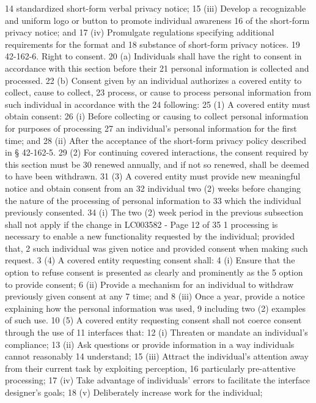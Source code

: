 14 standardized short-form verbal privacy notice;
15 (iii) Develop a recognizable and uniform logo or button to promote individual awareness
16 of the short-form privacy notice; and
17 (iv) Promulgate regulations specifying additional requirements for the format and
18 substance of short-form privacy notices.
19 42-162-6. Right to consent.
20 (a) Individuals shall have the right to consent in accordance with this section before their
21 personal information is collected and processed.
22 (b) Consent given by an individual authorizes a covered entity to collect, cause to collect,
23 process, or cause to process personal information from such individual in accordance with the
24 following:
25 (1) A covered entity must obtain consent:
26 (i) Before collecting or causing to collect personal information for purposes of processing
27 an individual's personal information for the first time; and
28 (ii) After the acceptance of the short-form privacy policy described in § 42-162-5.
29 (2) For continuing covered interactions, the consent required by this section must be
30 renewed annually, and if not so renewed, shall be deemed to have been withdrawn.
31 (3) A covered entity must provide new meaningful notice and obtain consent from an
32 individual two (2) weeks before changing the nature of the processing of personal information to
33 which the individual previously consented.
34 (i) The two (2) week period in the previous subsection shall not apply if the change in 
LC003582 - Page 12 of 35
1 processing is necessary to enable a new functionality requested by the individual; provided that,
2 such individual was given notice and provided consent when making such request.
3 (4) A covered entity requesting consent shall:
4 (i) Ensure that the option to refuse consent is presented as clearly and prominently as the
5 option to provide consent;
6 (ii) Provide a mechanism for an individual to withdraw previously given consent at any
7 time; and
8 (iii) Once a year, provide a notice explaining how the personal information was used,
9 including two (2) examples of such use.
10 (5) A covered entity requesting consent shall not coerce consent through the use of
11 interfaces that:
12 (i) Threaten or mandate an individual's compliance;
13 (ii) Ask questions or provide information in a way individuals cannot reasonably
14 understand;
15 (iii) Attract the individual's attention away from their current task by exploiting perception,
16 particularly pre-attentive processing;
17 (iv) Take advantage of individuals’ errors to facilitate the interface designer’s goals;
18 (v) Deliberately increase work for the individual;
